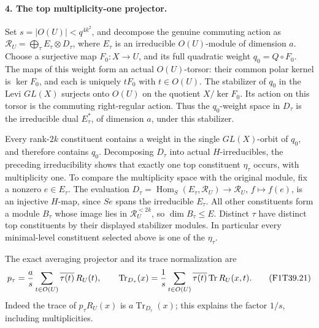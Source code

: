 \paragraph{4. The top multiplicity-one projector.}
Set \(s=|O(U)|<q^{4k^2}\), and decompose the genuine
commuting action as
\(\mathcal R_U=\bigoplus_\tau E_\tau\otimes D_\tau\),
where \(E_\tau\) is an irreducible \(O(U)\)-module of
dimension \(a\). Choose a surjective map
\(F_0:X\to U\), and its full quadratic weight
\(q_0=Q\circ F_0\). The maps of this weight form an
actual \(O(U)\)-torsor: their common polar kernel is
\(\ker F_0\), and each is uniquely \(tF_0\) with
\(t\in O(U)\). The stabilizer of \(q_0\) in the
Levi \(GL(X)\) surjects onto \(O(U)\) on the quotient
\(X/\ker F_0\). Its action on this torsor is the
commuting right-regular action. Thus the \(q_0\)-weight
space in \(D_\tau\) is the irreducible dual
\(E_\tau^*\), of dimension \(a\), under this stabilizer.

Every rank-\(2k\) constituent contains a weight in the
single \(GL(X)\)-orbit of \(q_0\), and therefore
contains \(q_0\). Decomposing \(D_\tau\) into actual
\(H\)-irreducibles, the preceding irreducibility shows
that exactly one top constituent \(\eta_\tau\) occurs,
with multiplicity one. To compare the multiplicity space
with the original module, fix a nonzero \(e\in E_\tau\).
The evaluation \(D_\tau=\operatorname{Hom}_S(E_\tau,\mathcal R_U)\to\mathcal R_U\),
\(f\mapsto f(e)\), is an injective \(H\)-map, since
\(S e\) spans the irreducible \(E_\tau\). All other
constituents form a module \(B_\tau\) whose image lies
in \(\mathcal R_U^{<2k}\), so \(\dim B_\tau\le E\). Distinct \(\tau\) have distinct
top constituents by their displayed stabilizer modules.
In particular every minimal-level constituent selected
above is one of the \(\eta_\tau\).

The exact averaging projector and its trace normalization are
\[
 p_\tau={a\over s}\sum_{t\in O(U)}\overline{\tau(t)}\,R_U(t),
 \qquad
 \operatorname{Tr}_{D_\tau}(x)
 ={1\over s}\sum_{t\in O(U)}\overline{\tau(t)}
                                  \operatorname{Tr}R_U(x,t).
 \tag{F1T39.21}
\]
Indeed the trace of \(p_\tau R_U(x)\) is
\(a\operatorname{Tr}_{D_\tau}(x)\); this explains the
factor \(1/s\), including multiplicities.

